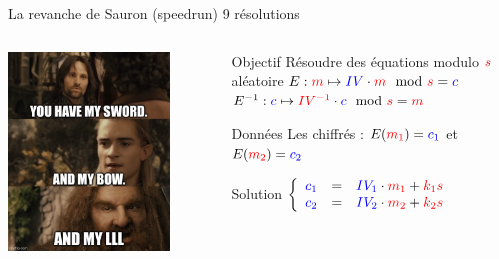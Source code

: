 
\begin{frame}{La revanche de Sauron \FiveStar \FiveStar (speedrun) \hfill 9 résolutions}
    \begin{columns}[c]
        \begin{center}                  
            \includegraphics[width=0.8\textwidth]{img/meme/la-revanche-intro.png}
        \end{center}

           \begin{outline}
            \1 Objectif
                \2 Résoudre des équations modulo $\textcolor{red}{s}$ aléatoire 
                \2 $E : \u{m} \mapsto \k{IV}\cdot \u{m} \mod \u{s} = \k{c}$
                \2 $E^{-1} : \k{c} \mapsto \u{IV^{-1}}\cdot \k{c} \mod \u{s} = \u{m}$

               \1 Données
                \2 Les chiffrés : $E(\textcolor{red}{m_1})=\textcolor{blue}{c_1}$ et $E(\textcolor{red}{m_2}) = \textcolor{blue}{c_2}$

                \pause
                
               \1 Solution
                \2  $\left\{ \begin{array}{r c l} \textcolor{blue}{c_1} &=& \textcolor{blue}{IV_1}\cdot\textcolor{red}{m_1}+\textcolor{red}{k_1}\textcolor{red}{s} \\
                        \textcolor{blue}{c_2} &=& \textcolor{blue}{IV_2}\cdot\textcolor{red}{m_2} +\textcolor{red}{k_2}\textcolor{red}{s} \\
                    \end{array}
                \right.$
                

\end{outline}
\end{columns}
\end{frame}
